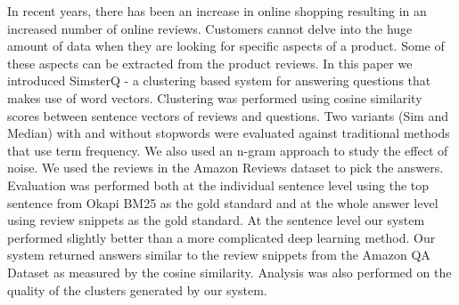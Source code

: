 In recent years, there has been an increase in online shopping resulting in an increased number of online reviews. Customers cannot delve into the huge amount of data when they are looking for specific aspects of a product. Some of these aspects can be extracted from the product reviews. In this paper we introduced SimsterQ - a clustering based system for answering questions that makes use of word vectors. Clustering was performed using cosine similarity scores between sentence vectors of reviews and questions. Two variants (Sim and Median) with and without stopwords were evaluated against traditional methods that use term frequency. We also used an n-gram approach to study the effect of noise. We used the reviews in the Amazon Reviews dataset to pick the answers. Evaluation was performed both at the individual sentence level using the top sentence from Okapi BM25 as the gold standard and at the whole answer level using review snippets as the gold standard. At the sentence level our system performed slightly better than a more complicated deep learning method. Our system returned answers similar to the review snippets from the Amazon QA Dataset as measured by the cosine similarity. Analysis was also performed on the quality of the clusters generated by our system.
